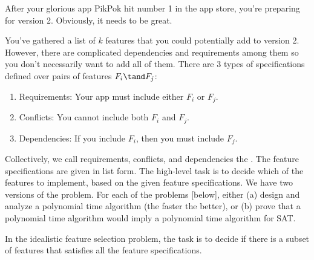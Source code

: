 \documentclass{article}
\begin{document}
 After your glorious app PikPok hit number 1 in the app store, you're
preparing for version 2.
Obviously, it needs to be great.

You've gathered a list of \( k \) features  that you could potentially add to version 2.
However, there are complicated dependencies and requirements among them so you don't necessarily want to add all of them.
There are 3 types of specifications defined over pairs of features \( F_i \tand F_j \): \begin{enumerate}
  \item Requirements: Your app must include either \( F_i \) or \( F_j \).
  \item Conflicts: You cannot include both \( F_i \) and \( F_j \).
  \item Dependencies: If you include \( F_i \), then you must include \( F_j \).
\end{enumerate}
Collectively, we call requirements, conflicts, and dependencies the .
The feature specifications are given in list form.
The high-level task is to decide which of the features to implement, based on the given feature specifications.
We have two versions of the problem. For each of the problems [below], either (a) design and analyze a polynomial time algorithm (the faster the better), or (b) prove that a polynomial time algorithm would imply a polynomial time algorithm for SAT.
\setcounter{section}{10}
\setcounter{exercise}{3}



\begin{subexercise}
In the idealistic feature selection problem, the task is to decide if there is a subset of features that satisfies all the feature specifications.
\end{subexercise}
\end{document}
